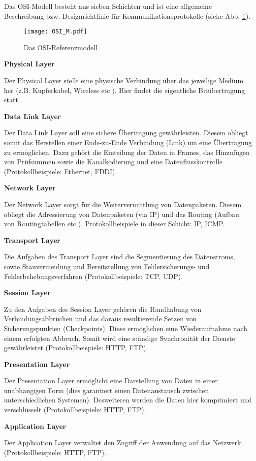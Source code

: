 Das OSI-Modell besteht aus sieben Schichten und ist eine allgemeine Beschreibung
bzw. Designrichtlinie f{\"u}r Kommunikationsprotokolle (siehe Abb.
\ref{fig:OSI_M}).

\begin{figure}[H]
\centering
\texttt{[image: OSI\_M.pdf]}
\caption{Das OSI-Referenzmodell}
\label{fig:OSI_M}
\end{figure}

\textbf{Physical Layer}

Der Physical Layer stellt eine physische Verbindung {\"u}ber das jeweilige
Medium her (z.B. Kupferkabel, Wireless etc.). Hier findet die eigentliche
Bit{\"u}bertragung statt.

\textbf{Data Link Layer}

Der Data Link Layer soll eine sichere {\"U}bertragung gew{\"a}hrleisten. Diesem
obliegt somit das Herstellen einer Ende-zu-Ende Verbindung (Link) um eine
{\"U}bertragung zu erm{\"o}glichen. Dazu geh{\"o}rt die Einteilung der Daten in
Frames, das Hinzuf{\"u}gen von Pr{\"u}fsummen sowie die Kanalkodierung und eine
Datenflusskontrolle (Protokollbeispiele: Ethernet, FDDI).

\textbf{Network Layer}

Der Network Layer sorgt f{\"u}r die Weitervermittlung von Datenpaketen. Diesem
obliegt die Adressierung von Datenpaketen (via \gls{IP}) und das Routing (Aufbau
von Routingtabellen etc.). Protokollbeispiele in dieser Schicht: \gls{IP}, ICMP.

\textbf{Transport Layer}

Die Aufgaben des Transport Layer sind die Segmentierung des Datenstroms, sowie
Stauvermeidung und Bereitstellung von Fehlersicherungs- und
Fehlerbehebungsverfahren (Protokollbeispiele: \gls{TCP}, \gls{UDP}).

\textbf{Session Layer}

Zu den Aufgaben des Session Layer geh{\"o}ren die Handhabung von
Verbindungsabbr{\"u}chen und das daraus resultierende Setzen von
Sicherungspunkten (Checkpoints). Diese erm{\"o}glichen eine Wiederaufnahme
nach einem erfolgten Abbruch. Somit wird eine st{\"a}ndige Synchronit{\"a}t der
Dienste gew{\"a}hrleistet (Protokollbeispiele: HTTP, FTP).

\textbf{Presentation Layer}

Der Presentation Layer erm{\"o}glicht eine Darstellung von Daten in
einer unabh{\"a}ngigen Form (dies garantiert einen Datenaustausch zwischen
unterschiedlichen Systemen). Desweiteren werden die Daten hier komprimiert und
verschl{\"u}sselt (Protokollbeispiele: HTTP, FTP).

\textbf{Application Layer}

Der Application Layer verwaltet den Zugriff der Anwendung auf das Netzwerk
(Protokollbeispiele: HTTP, FTP).
